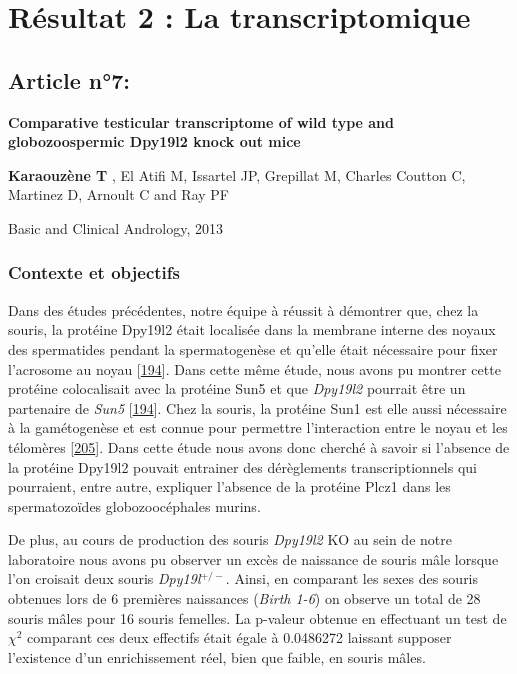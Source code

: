 \documentclass[12pt,a4paper,twoside]{ugathesis}
\theoremstyle{definition}
\theoremstyle{definition}
\theoremstyle{definition}
\theoremstyle{remark}
\begin{document}
\newpage

\section{Résultat 2 : La transcriptomique}\label{transcriptome}

\subsection{Article n°7:}\label{article-n7}

\textbf{Comparative testicular transcriptome of wild type and
globozoospermic Dpy19l2 knock out mice}

\textbf{Karaouzène T} , El Atifi M, Issartel JP, Grepillat M, Charles
Coutton C, Martinez D, Arnoult C and Ray PF

Basic and Clinical Andrology, 2013

\newpage

\subsubsection{Contexte et objectifs}\label{contexte-et-objectifs-6}

Dans des études précédentes, notre équipe à réussit à démontrer que,
chez la souris, la protéine Dpy19l2 était localisée dans la membrane
interne des noyaux des spermatides pendant la spermatogenèse et qu'elle
était nécessaire pour fixer l'acrosome au noyau
{[}\protect\hyperlink{ref-Pierre2012}{194}{]}. Dans cette même étude,
nous avons pu montrer cette protéine colocalisait avec la protéine Sun5
et que \emph{Dpy19l2} pourrait être un partenaire de \emph{Sun5}
{[}\protect\hyperlink{ref-Pierre2012}{194}{]}. Chez la souris, la
protéine Sun1 est elle aussi nécessaire à la gamétogenèse et est connue
pour permettre l'interaction entre le noyau et les télomères
{[}\protect\hyperlink{ref-Ding2007}{205}{]}. Dans cette étude nous avons
donc cherché à savoir si l'absence de la protéine Dpy19l2 pouvait
entrainer des dérèglements transcriptionnels qui pourraient, entre
autre, expliquer l'absence de la protéine Plcz1 dans les spermatozoïdes
globozoocéphales murins.

De plus, au cours de production des souris \emph{Dpy19l2} KO au sein de
notre laboratoire nous avons pu observer un excès de naissance de souris
mâle lorsque l'on croisait deux souris \emph{Dpy19l}\(^{+/-}\). Ainsi,
en comparant les sexes des souris obtenues lors de 6 premières
naissances (\emph{Birth 1-6}) on observe un total de 28 souris mâles
pour 16 souris femelles. La p-valeur obtenue en effectuant un test de
\(\chi^2\) comparant ces deux effectifs était égale à 0.0486272 laissant
supposer l'existence d'un enrichissement réel, bien que faible, en
souris mâles.
\end{document}
